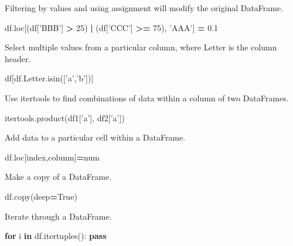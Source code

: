 \documentclass[]{book}
\newenvironment{Shaded}{\begin{snugshade}}{\end{snugshade}}
\newcommand{\ControlFlowTok}[1]{\textcolor[rgb]{0.13,0.29,0.53}{\textbf{#1}}}
\newcommand{\DecValTok}[1]{\textcolor[rgb]{0.00,0.00,0.81}{#1}}
\newcommand{\FloatTok}[1]{\textcolor[rgb]{0.00,0.00,0.81}{#1}}
\newcommand{\KeywordTok}[1]{\textcolor[rgb]{0.13,0.29,0.53}{\textbf{#1}}}
\newcommand{\NormalTok}[1]{#1}
\newcommand{\OperatorTok}[1]{\textcolor[rgb]{0.81,0.36,0.00}{\textbf{#1}}}
\newcommand{\StringTok}[1]{\textcolor[rgb]{0.31,0.60,0.02}{#1}}
\newcommand{\VariableTok}[1]{\textcolor[rgb]{0.00,0.00,0.00}{#1}}
\begin{document}
Filtering by values and using assignment will modify the original DataFrame.

\begin{Shaded}
\begin{Highlighting}[]
\NormalTok{df.loc[(df[}\StringTok{'BBB'}\NormalTok{] }\OperatorTok{>} \DecValTok{25}\NormalTok{) }\OperatorTok{|}\NormalTok{ (df[}\StringTok{'CCC'}\NormalTok{] }\OperatorTok{>=} \DecValTok{75}\NormalTok{), }\StringTok{'AAA'}\NormalTok{] }\OperatorTok{=} \FloatTok{0.1}
\end{Highlighting}
\end{Shaded}

Select multiple values from a particular column, where Letter is the column header.

\begin{Shaded}
\begin{Highlighting}[]
\NormalTok{df[df.Letter.isin([}\StringTok{'a'}\NormalTok{,}\StringTok{'b'}\NormalTok{])]}
\end{Highlighting}
\end{Shaded}

Use itertools to find combinations of data within a column of two DataFrames.

\begin{Shaded}
\begin{Highlighting}[]
\NormalTok{itertools.product(df1[}\StringTok{'a'}\NormalTok{], df2[}\StringTok{'a'}\NormalTok{])}
\end{Highlighting}
\end{Shaded}

Add data to a particular cell within a DataFrame.

\begin{Shaded}
\begin{Highlighting}[]
\NormalTok{df.loc[index,column]}\OperatorTok{=}\NormalTok{num}
\end{Highlighting}
\end{Shaded}

Make a copy of a DataFrame.

\begin{Shaded}
\begin{Highlighting}[]
\NormalTok{df.copy(deep}\OperatorTok{=}\VariableTok{True}\NormalTok{)}
\end{Highlighting}
\end{Shaded}

Iterate through a DataFrame.

\begin{Shaded}
\begin{Highlighting}[]
\ControlFlowTok{for}\NormalTok{ i }\KeywordTok{in}\NormalTok{ df.itertuples():}
    \ControlFlowTok{pass}
\end{Highlighting}
\end{Shaded}
\end{document}
